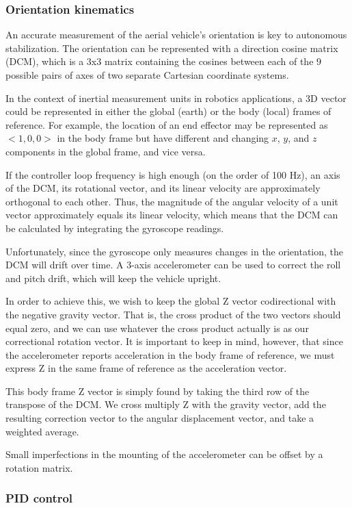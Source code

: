 \documentclass[12pt,letterpaper]{article}
\begin{document}
\subsubsection*{Orientation kinematics}

An accurate measurement of the aerial vehicle's orientation is key to
autonomous stabilization. The orientation can be represented with a direction
cosine matrix (DCM), which is a 3x3 matrix containing the cosines between each
of the 9 possible pairs of axes of two separate Cartesian coordinate systems.

In the context of inertial measurement units in robotics applications, a 3D
vector could be represented in either the global (earth) or the body (local)
frames of reference. For example, the location of an end effector may be
represented as $<1, 0, 0>$ in the body frame but have different and changing
$x$, $y$, and $z$ components in the global frame, and vice versa.

If the controller loop frequency is high enough (on the order of 100 Hz), an
axis of the DCM, its rotational vector, and its linear velocity are
approximately orthogonal to each other. Thus, the magnitude of the angular
velocity of a unit vector approximately equals its linear velocity, which means
that the DCM can be calculated by integrating the gyroscope readings.

Unfortunately, since the gyroscope only measures changes in the orientation,
the DCM will drift over time. A 3-axis accelerometer can be used to correct the
roll and pitch drift, which will keep the vehicle upright.

In order to achieve this, we wish to keep the global Z vector codirectional
with the negative gravity vector. That is, the cross product of the two vectors
should equal zero, and we can use whatever the cross product actually is as our
correctional rotation vector. It is important to keep in mind, however, that
since the accelerometer reports acceleration in the body frame of reference, we
must express Z in the same frame of reference as the acceleration vector.

This body frame Z vector is simply found by taking the third row of the
transpose of the DCM. We cross multiply Z with the gravity vector, add the
resulting correction vector to the angular displacement vector, and take a
weighted average.

Small imperfections in the mounting of the accelerometer can be offset by a
rotation matrix.


\subsubsection*{PID control}
\end{document}
